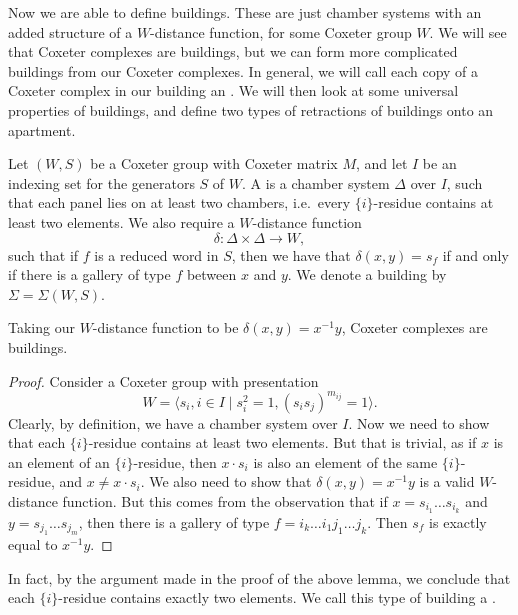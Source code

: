 \documentclass[11pt]{article}
\begin{document}
Now we are able to define buildings. These are just chamber systems with an added structure of a $W$-distance function, for some Coxeter group $W$. We will see that Coxeter complexes are buildings, but we can form more complicated buildings from our Coxeter complexes. In general, we will call each copy of a Coxeter complex in our building an . We will then look at some universal properties of buildings, and define two types of retractions of buildings onto an apartment. 

\begin{definition}
    Let $(W,S)$ be a Coxeter group with Coxeter matrix $M$, and let $I$ be an indexing set for the generators $S$ of $W$. A  is a chamber system $\Delta$ over $I$, such that each panel lies on at least two chambers, i.e.\ every $\{i\}$-residue contains at least two elements. We also require a $W$-distance function
    \[\delta:\Delta\times \Delta \to W,\]
    such that if $f$ is a reduced word in $S$, then we have that $\delta(x,y)=s_f$ if and only if there is a gallery of type $f$ between $x$ and $y$. We denote a building by $\Sigma=\Sigma(W,S)$. 
\end{definition}

\begin{lemma}\label{cox}
    Taking our $W$-distance function to be $\delta(x,y)=x^{-1}y$, Coxeter complexes are buildings.
\end{lemma}

\begin{proof}
    Consider a Coxeter group with presentation
    \[W=\langle s_i,i\in I\mid s_i^2=1,(s_is_j)^{m_{ij}}=1\rangle.\]
    Clearly, by definition, we have a chamber system over $I$. Now we need to show that each $\{i\}$-residue contains at least two elements. But that is trivial, as if $x$ is an element of an $\{i\}$-residue, then $x\cdot s_i$ is also an element of the same $\{i\}$-residue, and $x\neq x\cdot s_i$. 
    We also need to show that $\delta(x,y)=x^{-1}y$ is a valid $W$-distance function. But this comes from the observation that if $x=s_{i_1}\hdots  s_{i_k}$ and $y=s_{j_1}\hdots  s_{j_m}$, then there is a gallery of type $f=i_k\hdots  i_1j_1\hdots  j_k$. Then $s_f$ is exactly equal to $x^{-1}y$. 
\end{proof}

In fact, by the argument made in the proof of the above lemma, we conclude that each $\{i\}$-residue contains exactly two elements. We call this type of building a .
\end{document}
